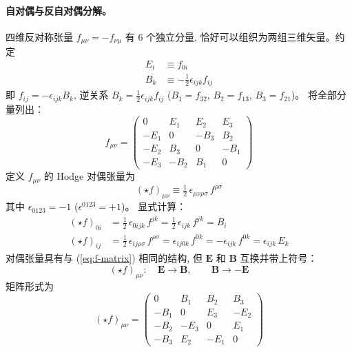 \paragraph*{自对偶与反自对偶分解。}
四维反对称张量 $f_{\mu\nu}=-f_{\nu\mu}$ 有 6 个独立分量, 
恰好可以组织为两组三维矢量。约定
\begin{subequations}\label{eq:EB-def}
\begin{align}
    E_i &\equiv f_{0i} \\
    B_k &\equiv -\tfrac{1}{2}\epsilon_{ijk}f_{ij}
\end{align}
\end{subequations}
即 $f_{ij} = -\epsilon_{ijk}B_k$, 
逆关系 $B_k = \frac{1}{2}\epsilon_{ijk}f_{ij}$ 
($B_1 = f_{32}$, $B_2 = f_{13}$, $B_3 = f_{21}$)。
将全部分量列出：
\begin{equation}
    f_{\mu\nu} = \begin{pmatrix}
    0 & E_1 & E_2 & E_3 \\
    -E_1 & 0 & -B_3 & B_2 \\
    -E_2 & B_3 & 0 & -B_1 \\
    -E_3 & -B_2 & B_1 & 0
    \end{pmatrix}
    \label{eq:f-matrix}
\end{equation}
定义 $f_{\mu\nu}$ 的 Hodge 对偶张量为
\begin{equation}
    (\star f)_{\mu\nu} \equiv \tfrac{1}{2}\,\epsilon_{\mu\nu\rho\sigma}\,f^{\rho\sigma}
    \label{eq:hodge-def}
\end{equation}
其中 $\epsilon_{0123}=-1$ ($\epsilon^{0123}=+1$)。
显式计算：
\begin{subequations}\label{eq:hodge-components}
\begin{align}
    (\star f)_{0i}
    &= \tfrac{1}{2}\,\epsilon_{0ijk}\,f^{jk} 
    = \tfrac{1}{2}\,\epsilon_{ijk}\,f^{jk} = B_i \\
    (\star f)_{ij}
    &= \tfrac{1}{2}\,\epsilon_{ij\rho\sigma}\,f^{\rho\sigma}
    = \epsilon_{ij0k}\,f^{0k}
    = -\epsilon_{ijk}\,f^{0k} = \epsilon_{ijk}\,E_k
\end{align}
\end{subequations}
对偶张量具有与 (\ref{eq:f-matrix}) 相同的结构, 
但 $\boldsymbol{E}$ 和 $\boldsymbol{B}$ 互换并带上符号：
\begin{equation}
    (\star f)_{\mu\nu}: \quad \boldsymbol{E} \to \boldsymbol{B}, \qquad 
    \boldsymbol{B} \to -\boldsymbol{E}
    \label{eq:hodge-EB}
\end{equation}
矩阵形式为
\begin{equation}
    (\star f)_{\mu\nu} = \begin{pmatrix}
    0 & B_1 & B_2 & B_3 \\
    -B_1 & 0 & E_3 & -E_2 \\
    -B_2 & -E_3 & 0 & E_1 \\
    -B_3 & E_2 & -E_1 & 0
    \end{pmatrix}
\end{equation}
